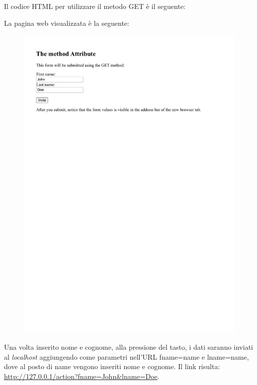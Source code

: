 \documentclass[a4paper]{article}
\begin{document}
	Il codice HTML per utilizzare il metodo GET è il seguente:
	
	La pagina web visualizzata è la seguente:
	\begin{figure}[!htp]
		\centering
		\includegraphics[width=\textwidth]{img/form-get.pdf}
	\end{figure}
	
	\noindent
	Una volta inserito nome e cognome, alla pressione del tasto, i dati saranno inviati al \emph{localhost} aggiungendo come parametri nell'URL \textsf{fname=name} e \textsf{lname=name}, dove al posto di name vengono inseriti nome e cognome. Il link risulta: \url{http://127.0.0.1/action?fname=John&lname=Doe}.\newpage
	
\end{document}
